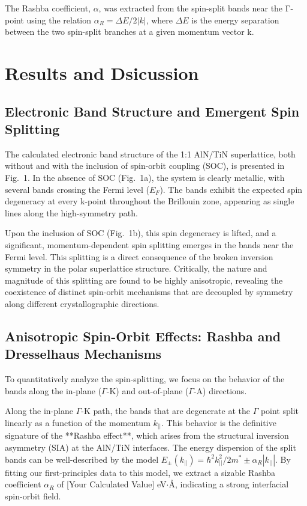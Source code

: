 \documentclass[aps,prl,reprint,superscriptaddress]{revtex4-2}
\begin{document}
The Rashba coefficient, $\alpha$, was extracted from the spin-split bands near
the Γ-point using the relation $\alpha_R = \Delta E/2|k| $, where $\Delta E$ is
the energy separation between the two spin-split branches at a given momentum
vector k.
 
\section{Results and Dsicussion}

\subsection{Electronic Band Structure and Emergent Spin Splitting}

The calculated electronic band structure of the 1:1 AlN/TiN superlattice, both
without and with the inclusion of spin-orbit coupling (SOC), is presented in
Fig.~1. In the absence of SOC (Fig.~1a), the system is clearly metallic, with
several bands crossing the Fermi level ($E_F$). The bands exhibit the expected
spin degeneracy at every k-point throughout the Brillouin zone, appearing as
single lines along the high-symmetry path.

Upon the inclusion of SOC (Fig.~1b), this spin degeneracy is lifted, and a
significant, momentum-dependent spin splitting emerges in the bands near the
Fermi level. This splitting is a direct consequence of the broken inversion
symmetry in the polar superlattice structure. Critically, the nature and
magnitude of this splitting are found to be highly anisotropic, revealing the
coexistence of distinct spin-orbit mechanisms that are decoupled by symmetry
along different crystallographic directions.

\subsection{Anisotropic Spin-Orbit Effects: Rashba and Dresselhaus Mechanisms}

To quantitatively analyze the spin-splitting, we focus on the behavior of the
bands along the in-plane ($\Gamma$-K) and out-of-plane ($\Gamma$-A) directions.

Along the in-plane $\Gamma$-K path, the bands that are degenerate at the
$\Gamma$ point split linearly as a function of the momentum $k_{||}$. This
behavior is the definitive signature of the **Rashba effect**, which arises
from the structural inversion asymmetry (SIA) at the AlN/TiN interfaces. The
energy dispersion of the split bands can be well-described by the model
$E_{\pm}(k_{||}) = \hbar^2 k_{||}^2 / 2m^* \pm \alpha_R |k_{||}|$. By fitting
our first-principles data to this model, we extract a sizable Rashba
coefficient $\alpha_R$ of [Your Calculated Value] eV$\cdot$\AA, indicating a
strong interfacial spin-orbit field.
\end{document}
